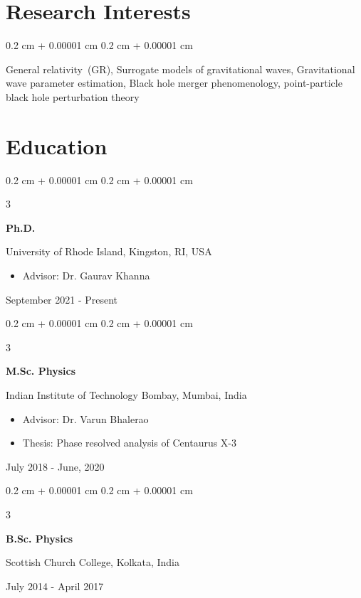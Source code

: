 \documentclass[10pt, letterpaper]{article}
\newenvironment{highlights}{
    \begin{itemize}[
        topsep=0.10 cm,
        parsep=0.10 cm,
        partopsep=0pt,
        itemsep=0pt,
        leftmargin=0.4 cm + 10pt
    ]
}{
    \end{itemize}
}
\newenvironment{onecolentry}{
    \begin{adjustwidth}{
        0.2 cm + 0.00001 cm
    }{
        0.2 cm + 0.00001 cm
    }
}{
    \end{adjustwidth}
}
\newenvironment{threecolentry}[3][]{
    \onecolentry
    \def\thirdColumn{#3}
    \setcolumnwidth{2.5 cm, \fill, 4.5 cm}
    \begin{paracol}{3}
    {\raggedright #2} \switchcolumn
}{
    \switchcolumn \raggedleft \thirdColumn
    \end{paracol}
    \endonecolentry
}
\begin{document}
\vspace{0.3 cm - 0.3 cm}

\section{Research Interests}
  \begin{onecolentry}
    General relativity~(GR), Surrogate models of gravitational waves, Gravitational wave parameter estimation, Black hole merger phenomenology, point-particle black hole perturbation theory
  \end{onecolentry}

\section{Education}
  \begin{threecolentry}{\textbf{Ph.D.}}{
    September 2021 - Present
  }
    University of Rhode Island, Kingston, RI, USA
    \begin{highlights}
      \item Advisor: Dr. Gaurav Khanna
    \end{highlights}
  \end{threecolentry}

\begin{threecolentry}{\textbf{M.Sc. Physics}}{
    July 2018 - June, 2020
  }
    Indian Institute of Technology Bombay, Mumbai, India
  \begin{highlights}
    \item Advisor: Dr. Varun Bhalerao
    \item Thesis: Phase resolved analysis of Centaurus X-3
  \end{highlights}
\end{threecolentry} 

\begin{threecolentry}{\textbf{B.Sc. Physics}}{
  July 2014 - April 2017
}
  Scottish Church College, Kolkata, India
\end{threecolentry}
\end{document}
